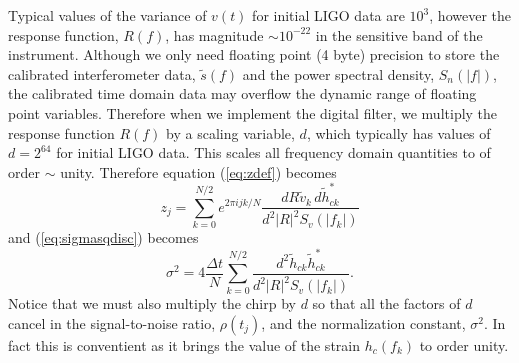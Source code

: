 Typical values of the variance of $v(t)$ for initial LIGO data are $10^3$,
however the response function, $R(f)$, has magnitude $\sim 10^{-22}$ in the
sensitive band of the instrument. Although we only need floating point (4
byte) precision to store the calibrated interferometer data, $\tilde{s}(f)$
and the power spectral density, $S_n(|f|)$, the calibrated time domain data may
overflow the dynamic range of floating point variables. Therefore when we
implement the digital filter, we multiply the response function $R(f)$ by a
scaling variable, $d$, which typically has values of $d = 2^{64}$ for initial
LIGO data. This scales all frequency domain quantities to of order $\sim$ 
unity.  Therefore equation (\ref{eq:zdef}) becomes
\begin{equation}
\label{eq:zdefcal}
z_j = \sum_{k=0}^{N/2} e^{2\pi ijk/N} 
  \frac{dR\tilde{v}_k\, d\tilde{h}_{ck}^\ast}
  {d^2|R|^2S_v\left(\left|f_k\right|\right)}
\end{equation}
and (\ref{eq:sigmasqdisc}) becomes
\begin{equation}
\label{eq:sigmasqdisccal}
\sigma^2 = 4 \frac{\Delta t}{N} \sum_{k=0}^{N/2}
\frac{d^2 \tilde{h}_{ck}\tilde{h}_{ck}^\ast}
{d^2|R|^2S_v\left(\left|f_k\right|\right)}. 
\end{equation}
Notice that we must also multiply the chirp by $d$ so that all the factors of
$d$ cancel in the signal-to-noise ratio, $\rho(t_j)$, and the normalization
constant, $\sigma^2$. In fact this is conventient as it brings the value of
the strain $h_c(f_k)$ to order unity. 

